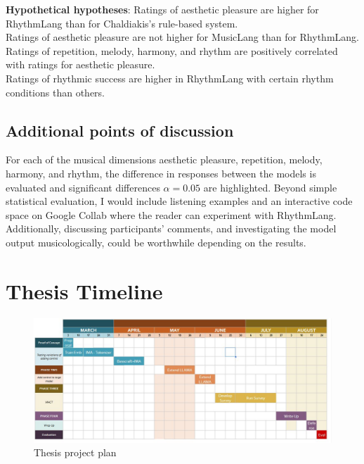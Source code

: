 \textbf{Hypothetical hypotheses}: Ratings of aesthetic pleasure are higher for RhythmLang than for Chaldiakis's rule-based system. \\
Ratings of aesthetic pleasure are not higher for MusicLang than for RhythmLang. \\
Ratings of repetition, melody, harmony, and rhythm are positively correlated with ratings for aesthetic pleasure.\\
Ratings of rhythmic success are higher in RhythmLang with certain rhythm conditions than others. 

\subsection{Additional points of discussion}
For each of the musical dimensions aesthetic pleasure, repetition, melody, harmony, and rhythm, the difference in responses between the models is evaluated and significant differences $\alpha = 0.05$ are highlighted. 
Beyond simple statistical evaluation, I would include listening examples and an interactive code space on Google Collab where the reader can experiment with RhythmLang. Additionally, discussing participants' comments, and investigating the model output musicologically, could be worthwhile depending on the results. 
\section{Thesis Timeline}

\begin{figure}[H]
    \centering
    \includegraphics[width=1\textwidth]{IMAGES/project_plan.jpg} 
    \caption{Thesis project plan}
    \label{fig:projectplan}
\end{figure}


